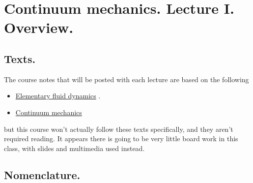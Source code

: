 %
%

\chapter{Continuum mechanics.  Lecture I.  Overview.}
\label{chap:continuumL1}
{}
\date{Jan 11, 2012}

\beginArtWithToc

\section{Texts.}

The course notes that will be posted with each lecture are based on the following

\begin{itemize}
\item \href{http://www.amazon.com/Elementary-Dynamics-Applied-Mathematics-Computing/dp/0198596790/ref=sr_1_1?ie=UTF8&qid=1326302753&sr=8-1}{Elementary fluid dynamics} \cite{acheson1990elementary}.
\item \href{http://www.amazon.com/Theory-Elasticity-Third-Theoretical-Physics/dp/075062633X/ref=sr_1_6?s=books&ie=UTF8&qid=1326302957&sr=1-6}{Continuum mechanics} \cite{landau1960theory}
\end{itemize}


but this course won't actually follow these texts specifically, and they aren't required reading.  It appears there is going to be very little board work in this class, with slides and multimedia used instead.

\section{Nomenclature.}

